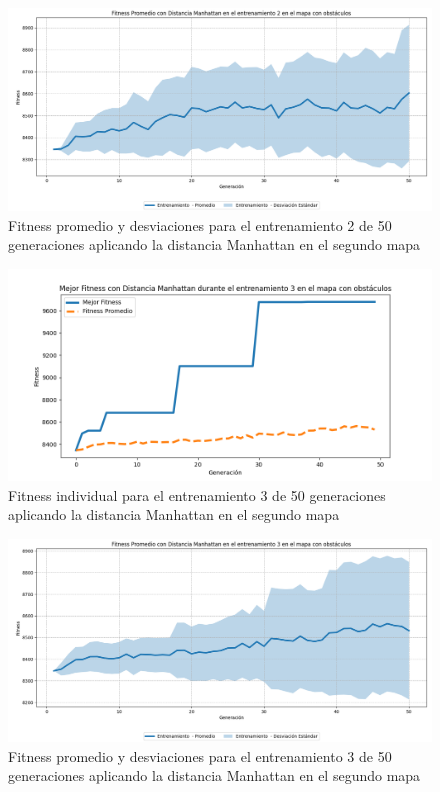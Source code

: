 \documentclass[conference]{IEEEtran}
\begin{document}
\begin{figure}[H]
    \centering
    \includegraphics[width=0.9 \linewidth]{Manhattan/Mapa2/Fitness_2_Map2_Manh_50Gen_Sombra.png}
    \caption{Fitness promedio y desviaciones para el entrenamiento 2 de 50 generaciones aplicando la distancia Manhattan en el segundo mapa}
    \label{fig:manh_2_50_sombra_m2}
\end{figure}

\begin{figure}[H]
    \centering
    \includegraphics[width=0.9 \linewidth]{Manhattan/Mapa2/Fitness_3_Map2_Manh_50Gen.png}
    \caption{Fitness individual para el entrenamiento 3 de 50 generaciones aplicando la distancia Manhattan en el segundo mapa}
    \label{fig:manh_3_50_m2}
\end{figure}
\begin{figure}[H]
    \centering
    \includegraphics[width=0.9 \linewidth]{Manhattan/Mapa2/Fitness_3_Map2_Manh_50Gen_Sombra.png}
    \caption{Fitness promedio y desviaciones para el entrenamiento 3 de 50 generaciones aplicando la distancia Manhattan en el segundo mapa}
    \label{fig:manh_3_50_sombra_m2}
\end{figure}
\end{document}
